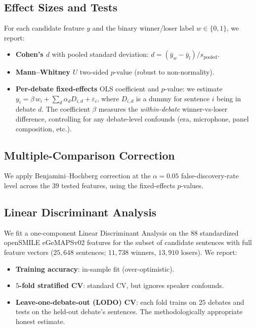 \documentclass[journal]{IEEEtran}
\begin{document}
\subsection{Effect Sizes and Tests}
For each candidate feature $y$ and the binary winner/loser label
$w \in \{0, 1\}$, we report:

\begin{itemize}
  \item \textbf{Cohen's $d$} with pooled standard deviation:
        $d = (\bar{y}_w - \bar{y}_l) / s_{\text{pooled}}$.
  \item \textbf{Mann--Whitney $U$} two-sided $p$-value (robust to
        non-normality).
  \item \textbf{Per-debate fixed-effects} OLS coefficient and $p$-value:
        we estimate $y_i = \beta\,w_i + \sum_d \alpha_d D_{i,d} + \varepsilon_i$,
        where $D_{i,d}$ is a dummy for sentence $i$ being in debate $d$.
        The coefficient $\beta$ measures the \emph{within-debate}
        winner-vs-loser difference, controlling for any debate-level
        confounds (era, microphone, panel composition, etc.).
\end{itemize}

\subsection{Multiple-Comparison Correction}
We apply Benjamini--Hochberg correction \cite{benjamini1995controlling}
at the $\alpha = 0.05$ false-discovery-rate level across the $39$ tested
features, using the fixed-effects $p$-values.

\subsection{Linear Discriminant Analysis}
We fit a one-component Linear Discriminant Analysis on the $88$
standardized openSMILE eGeMAPSv02 features for the subset of
candidate sentences with full feature vectors ($25{,}648$ sentences;
$11{,}738$ winners, $13{,}910$ losers). We report:

\begin{itemize}
  \item \textbf{Training accuracy}: in-sample fit (over-optimistic).
  \item \textbf{$5$-fold stratified CV}: standard CV, but ignores
        speaker confounds.
  \item \textbf{Leave-one-debate-out (LODO) CV}: each fold trains on
        $25$ debates and tests on the held-out debate's sentences.
        The methodologically appropriate honest estimate.
\end{itemize}
\end{document}
